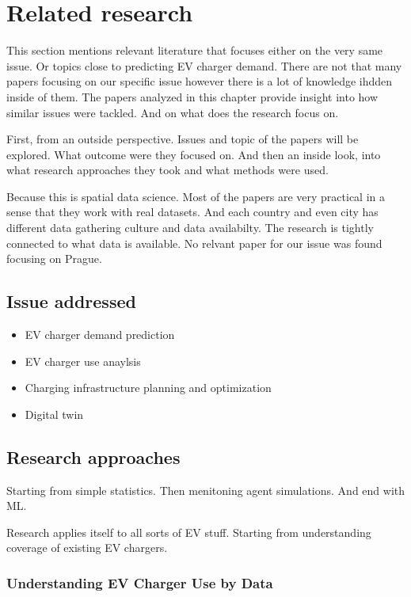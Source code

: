 \setchapterpreamble[u]{\margintoc}
\chapter{Related research}

This section mentions relevant literature that focuses either on the very same issue. Or topics close to predicting EV charger demand. There are not that many papers focusing on our specific issue however there is a lot of knowledge ihdden inside of them. The papers analyzed in this chapter provide insight into how similar issues were tackled. And on what does the research focus on.


First, from an outside perspective. Issues and topic of the papers will be explored. What outcome were they focused on. And then an inside look, into what research approaches they took and what methods were used.

Because this is spatial data science. Most of the papers are very practical in a sense that they work with real datasets. And each country and even city has different data gathering culture and data availabilty. The research is tightly connected to what data is available. No relvant paper for our issue was found focusing on Prague.

\section{Issue addressed}

\begin{itemize}
    \item EV charger demand prediction
    \item EV charger use anaylsis
    \item Charging infrastructure planning and optimization
    \item Digital twin
\end{itemize}

\section{Research approaches}

Starting from simple statistics. Then menitoning agent simulations. And end with ML.

Research applies itself to all sorts of EV stuff. Starting from understanding coverage of existing EV chargers.

\subsection{Understanding EV Charger Use by Data}

